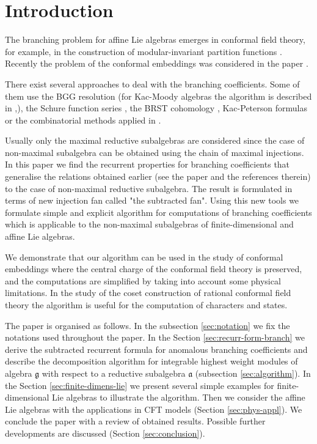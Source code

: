 \documentclass[a4paper,12pt]{article}
\theoremstyle{definition} \newtheorem{Def}{Definition}
\begin{document}
\section{Introduction}
\label{sec:introduction}

The branching problem for affine Lie algebras emerges in conformal field theory, for example, in the construction of modular-invariant partition functions \cite{difrancesco1997cft}. Recently the problem of the conformal embeddings was considered in the paper \cite{coquereaux2008conformal}.

There exist several approaches to deal with the branching coefficients. Some of them use the BGG
resolution \cite{bernstein1975differential} (for Kac-Moody algebras the algorithm is described in
\cite{kac1990idl},\cite{wakimoto2001idl}), the Schure function series \cite{fauser2006new}, the BRST
cohomology \cite{Hwang:1994yr}, Kac-Peterson formulas \cite{kac1990idl,quella2002branching} or the
combinatorial methods applied in \cite{feigin707principal}.

Usually only the maximal reductive subalgebras are considered since the case of non-maximal subalgebra can be obtained using the chain of maximal injections. In this paper we find the recurrent properties for branching coefficients that generalise the relations obtained earlier (see the paper \cite{ilyin812pbc} and the references therein) to the case of non-maximal reductive subalgebra. The result is formulated in terms of new injection fan called "the subtracted fan". Using this new tools we formulate simple and explicit algorithm for computations of branching coefficients which is applicable to the non-maximal subalgebras of finite-dimensional and affine Lie algebras.

We demonstrate that our algorithm can be used in the study of conformal embeddings where the central charge of the conformal field theory is preserved, and the computations are simplified by taking into account some physical limitations. In the study of the coset construction of rational conformal field theory the algorithm is useful for the computation of characters and states.

The paper is organised as follows. In the subsection \ref{sec:notation}  we fix the notations used throughout the paper. In the Section \ref{sec:recurr-form-branch} we derive the subtracted recurrent formula for anomalous branching coefficients and describe the decomposition algorithm for integrable highest weight modules of algebra $\mathfrak{g}$ with respect to a reductive subalgebra $\mathfrak{a}$ (subsection \ref{sec:algorithm}). In the Section \ref{sec:finite-dimens-lie} we present several simple examples for finite-dimensional Lie algebras to illustrate the algorithm. Then we consider the affine Lie algebras with the applications in CFT models (Section \ref{sec:phys-appl}). We conclude the paper with a review of obtained results. Possible further developments are discussed (Section \ref{sec:conclusion}).
\end{document}
